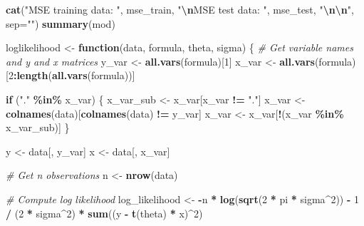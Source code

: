 \documentclass[
]{article}
\newenvironment{Shaded}{\begin{snugshade}}{\end{snugshade}}
\newcommand{\AttributeTok}[1]{\textcolor[rgb]{0.13,0.29,0.53}{#1}}
\newcommand{\CommentTok}[1]{\textcolor[rgb]{0.56,0.35,0.01}{\textit{#1}}}
\newcommand{\ControlFlowTok}[1]{\textcolor[rgb]{0.13,0.29,0.53}{\textbf{#1}}}
\newcommand{\DecValTok}[1]{\textcolor[rgb]{0.00,0.00,0.81}{#1}}
\newcommand{\FunctionTok}[1]{\textcolor[rgb]{0.13,0.29,0.53}{\textbf{#1}}}
\newcommand{\NormalTok}[1]{#1}
\newcommand{\OtherTok}[1]{\textcolor[rgb]{0.56,0.35,0.01}{#1}}
\newcommand{\SpecialCharTok}[1]{\textcolor[rgb]{0.81,0.36,0.00}{\textbf{#1}}}
\newcommand{\StringTok}[1]{\textcolor[rgb]{0.31,0.60,0.02}{#1}}
\begin{document}
\begin{Shaded}
\begin{Highlighting}[]
\FunctionTok{cat}\NormalTok{(}\StringTok{"MSE training data: "}\NormalTok{, mse\_train, }
    \StringTok{"}\SpecialCharTok{\textbackslash{}n}\StringTok{MSE test data: "}\NormalTok{, mse\_test,}
    \StringTok{"}\SpecialCharTok{\textbackslash{}n\textbackslash{}n}\StringTok{"}\NormalTok{,}
    \AttributeTok{sep=}\StringTok{""}\NormalTok{)}
\FunctionTok{summary}\NormalTok{(mod)}

\NormalTok{loglikelihood }\OtherTok{\textless{}{-}} \ControlFlowTok{function}\NormalTok{(data, formula, theta, sigma) \{}
  \CommentTok{\# Get variable names and y and x matrices}
\NormalTok{  y\_var }\OtherTok{\textless{}{-}} \FunctionTok{all.vars}\NormalTok{(formula)[}\DecValTok{1}\NormalTok{]}
\NormalTok{  x\_var }\OtherTok{\textless{}{-}} \FunctionTok{all.vars}\NormalTok{(formula)[}\DecValTok{2}\SpecialCharTok{:}\FunctionTok{length}\NormalTok{(}\FunctionTok{all.vars}\NormalTok{(formula))]}
  
  \ControlFlowTok{if}\NormalTok{ (}\StringTok{"."} \SpecialCharTok{\%in\%}\NormalTok{ x\_var) \{}
\NormalTok{    x\_var\_sub }\OtherTok{\textless{}{-}}\NormalTok{ x\_var[x\_var }\SpecialCharTok{!=} \StringTok{"."}\NormalTok{]}
\NormalTok{    x\_var }\OtherTok{\textless{}{-}} \FunctionTok{colnames}\NormalTok{(data)[}\FunctionTok{colnames}\NormalTok{(data) }\SpecialCharTok{!=}\NormalTok{ y\_var]}
\NormalTok{    x\_var }\OtherTok{\textless{}{-}}\NormalTok{ x\_var[}\SpecialCharTok{!}\NormalTok{(x\_var }\SpecialCharTok{\%in\%}\NormalTok{ x\_var\_sub)]}
\NormalTok{  \}}
  
\NormalTok{  y }\OtherTok{\textless{}{-}}\NormalTok{ data[, y\_var]}
\NormalTok{  x }\OtherTok{\textless{}{-}}\NormalTok{ data[, x\_var]}
  
  \CommentTok{\# Get n observations}
\NormalTok{  n }\OtherTok{\textless{}{-}} \FunctionTok{nrow}\NormalTok{(data)}
  
  \CommentTok{\# Compute log likelihood}
\NormalTok{  log\_likelihood }\OtherTok{\textless{}{-}} \SpecialCharTok{{-}}\NormalTok{n }\SpecialCharTok{*} \FunctionTok{log}\NormalTok{(}\FunctionTok{sqrt}\NormalTok{(}\DecValTok{2} \SpecialCharTok{*}\NormalTok{ pi }\SpecialCharTok{*}\NormalTok{ sigma}\SpecialCharTok{\^{}}\DecValTok{2}\NormalTok{)) }\SpecialCharTok{{-}} \DecValTok{1} \SpecialCharTok{/}\NormalTok{ (}\DecValTok{2} \SpecialCharTok{*}\NormalTok{ sigma}\SpecialCharTok{\^{}}\DecValTok{2}\NormalTok{) }\SpecialCharTok{*} \FunctionTok{sum}\NormalTok{((y }\SpecialCharTok{{-}} \FunctionTok{t}\NormalTok{(theta) }\SpecialCharTok{*}\NormalTok{ x)}\SpecialCharTok{\^{}}\DecValTok{2}\NormalTok{)}
  

\end{Highlighting}
\end{Shaded}
\end{document}
